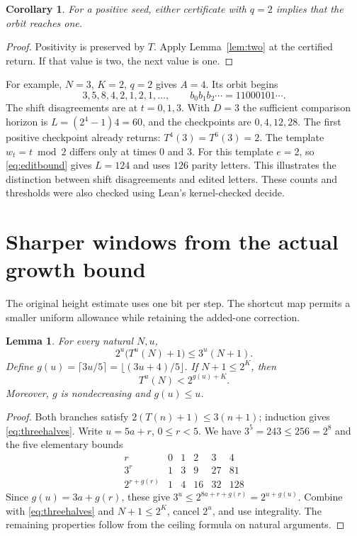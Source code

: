 \documentclass[11pt]{article}
\newtheorem{lemma}[theorem]{Lemma}
\newtheorem{corollary}[theorem]{Corollary}
\newcommand{\code}[1]{{\small\ttfamily #1}}
\begin{document}
\begin{corollary}\label{cor:one}
For a positive seed, either certificate with $q=2$ implies that the
orbit reaches one.
\end{corollary}
\begin{proof}
Positivity is preserved by $T$. Apply Lemma~\ref{lem:two} at the
certified return. If that value is two, the next value is one.
\end{proof}

For example, $N=3$, $K=2$, $q=2$ gives $A=4$. Its orbit begins
\[
3,5,8,4,2,1,2,1,\ldots,\qquad
b_0b_1b_2\cdots=11000101\cdots.
\]
The shift disagreements are at $t=0,1,3$. With $D=3$ the sufficient
comparison horizon is $L=(2^4-1)4=60$, and the checkpoints are
$0,4,12,28$. The first positive checkpoint already returns:
$T^4(3)=T^6(3)=2$.
The template $w_t=t\bmod2$ differs only at times $0$ and $3$.
For this template $e=2$, so \eqref{eq:editbound} gives $L=124$ and
uses $126$ parity letters. This illustrates the distinction between
shift disagreements and edited letters. These counts and thresholds
were also checked using Lean's kernel-checked \code{decide}.

\section{Sharper windows from the actual growth bound}\label{sec:sharp}
The original height estimate uses one bit per step. The shortcut map
permits a smaller uniform allowance while retaining the added-one correction.

\begin{lemma}\label{lem:sharpheight}
For every natural $N,u$,
\begin{equation}\label{eq:threehalves}
2^u\bigl(T^u(N)+1\bigr)\le3^u(N+1).
\end{equation}
Define $g(u)=\lceil3u/5\rceil=\lfloor(3u+4)/5\rfloor$.
If $N+1\le2^K$, then
\begin{equation}\label{eq:sharpheight}
T^u(N)<2^{g(u)+K}.
\end{equation}
Moreover, $g$ is nondecreasing and $g(u)\le u$.
\end{lemma}
\begin{proof}
Both branches satisfy $2(T(n)+1)\le3(n+1)$; induction gives
\eqref{eq:threehalves}. Write $u=5a+r$, $0\le r<5$. We have
$3^5=243\le256=2^8$ and the five elementary bounds
\[
\begin{array}{c|rrrrr}
r&0&1&2&3&4\\\hline
3^r&1&3&9&27&81\\
2^{r+g(r)}&1&4&16&32&128
\end{array}
\]
Since $g(u)=3a+g(r)$, these give
$3^u\le2^{8a+r+g(r)}=2^{u+g(u)}$.
Combine with \eqref{eq:threehalves} and $N+1\le2^K$, cancel $2^u$,
and use integrality. The remaining properties follow from the ceiling
formula on natural arguments.
\end{proof}
\end{document}
